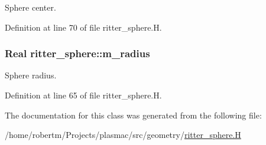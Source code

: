 Sphere center. 



Definition at line 70 of file ritter\+\_\+sphere.\+H.

\subsubsection[{\texorpdfstring{m\+\_\+radius}{m_radius}}]{\setlength{\rightskip}{0pt plus 5cm}Real ritter\+\_\+sphere\+::m\+\_\+radius\hspace{0.3cm}{\ttfamily [protected]}}\hypertarget{classritter__sphere_aaa41c5c6522dfa56645c41533c44fa0b}{}\label{classritter__sphere_aaa41c5c6522dfa56645c41533c44fa0b}


Sphere radius. 



Definition at line 65 of file ritter\+\_\+sphere.\+H.



The documentation for this class was generated from the following file\+:\begin{DoxyCompactItemize}
\item 
/home/robertm/\+Projects/plasmac/src/geometry/\hyperlink{ritter__sphere_8H}{ritter\+\_\+sphere.\+H}\end{DoxyCompactItemize}
